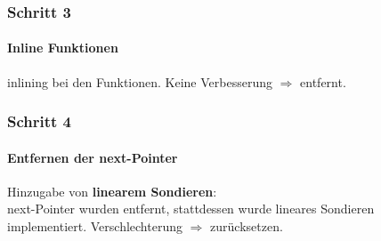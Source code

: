 \documentclass{beamer}
\begin{document}
  \begin{frame}
  	\frametitle{Schritt 3}
  	\framesubtitle{Inline Funktionen}
  	\sThree
  	inlining bei den Funktionen.
  	Keine Verbesserung $\Rightarrow$ entfernt.
  \end{frame}
  
  \begin{frame}
  	\frametitle{Schritt 4}
  	\framesubtitle{Entfernen der next-Pointer}
  	\sFourOne
  	Hinzugabe von \textbf{linearem Sondieren}:\\[1em]
  	\sFourTwo
  	next-Pointer wurden entfernt, stattdessen wurde lineares Sondieren implementiert.
  	Verschlechterung $\Rightarrow$ zur\"ucksetzen.  
  \end{frame}
  
\end{document}
